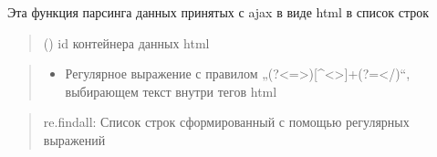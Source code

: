 \documentclass[letterpaper,10pt,russian]{sphinxmanual}
\begin{document}
\begin{fulllineitems}
\label{\detokenize{blueprints:blueprints.function.parser_html_ajax}}
\pysigstartsignatures
{}
\pysigstopsignatures
\sphinxAtStartPar
Эта функция парсинга данных принятых с ajax в виде html в список строк
\begin{quote}\begin{description}
\sphinxAtStartPar
{} () \textendash{} id контейнера данных html

\end{description}\end{quote}
\begin{description}
\begin{quote}\begin{description}
\begin{itemize}
\item {} 
\sphinxAtStartPar
Регулярное выражение с правилом „(?\textless{}=\textgreater{}){[}\textasciicircum{}\textless{}\textgreater{}{]}+(?=\textless{}/)“, выбирающем текст внутри тегов html

\end{itemize}

\end{description}\end{quote}

\end{description}
\begin{quote}\begin{description}
\sphinxAtStartPar
re.findall: Список строк сформированный с помощью регулярных выражений

\end{description}\end{quote}

\end{fulllineitems}

\end{document}
